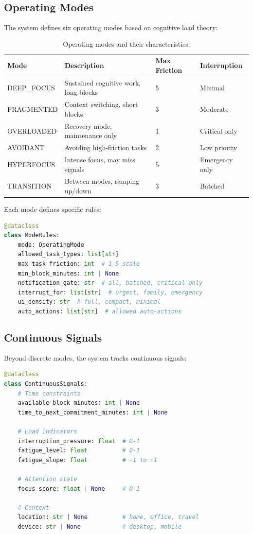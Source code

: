 \documentclass[11pt,a4paper]{article}
\begin{document}
\subsection{Operating Modes}

The system defines six operating modes based on cognitive load theory:

\begin{table}[t]
\centering
\caption{Operating modes and their characteristics.}
\label{tab:operating_modes}
\begin{tabular}{lp{5cm}ll}
\toprule
\textbf{Mode} & \textbf{Description} & \textbf{Max Friction} & \textbf{Interruption} \\
\midrule
DEEP\_FOCUS & Sustained cognitive work, long blocks & 5 & Minimal \\
FRAGMENTED & Context switching, short blocks & 3 & Moderate \\
OVERLOADED & Recovery mode, maintenance only & 1 & Critical only \\
AVOIDANT & Avoiding high-friction tasks & 2 & Low priority \\
HYPERFOCUS & Intense focus, may miss signals & 5 & Emergency only \\
TRANSITION & Between modes, ramping up/down & 3 & Batched \\
\bottomrule
\end{tabular}
\end{table}

Each mode defines specific rules:

\begin{lstlisting}[language=Python]
@dataclass
class ModeRules:
    mode: OperatingMode
    allowed_task_types: list[str]
    max_task_friction: int  # 1-5 scale
    min_block_minutes: int | None
    notification_gate: str  # all, batched, critical_only
    interrupt_for: list[str]  # urgent, family, emergency
    ui_density: str  # full, compact, minimal
    auto_actions: list[str]  # allowed auto-actions
\end{lstlisting}

\subsection{Continuous Signals}

Beyond discrete modes, the system tracks continuous signals:

\begin{lstlisting}[language=Python]
@dataclass
class ContinuousSignals:
    # Time constraints
    available_block_minutes: int | None
    time_to_next_commitment_minutes: int | None

    # Load indicators
    interruption_pressure: float  # 0-1
    fatigue_level: float          # 0-1
    fatigue_slope: float          # -1 to +1

    # Attention state
    focus_score: float | None     # 0-1

    # Context
    location: str | None          # home, office, travel
    device: str | None            # desktop, mobile
\end{lstlisting}
\end{document}
